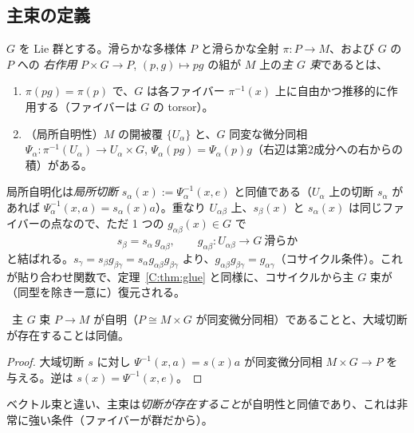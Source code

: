 \subsection{主束の定義}
\begin{defn}[主 $G$ 束]\label{C:def:principal}
$G$ を Lie 群とする。滑らかな多様体 $P$ と滑らかな全射 $\pi:P\to M$、および $G$ の $P$ への \emph{右作用} $P\times G\to P$, $(p,g)\mapsto pg$ の組が $M$ 上の\emph{主 $G$ 束}であるとは、
\begin{enumerate}
\item $\pi(pg)=\pi(p)$ で、$G$ は各ファイバー $\pi^{-1}(x)$ 上に自由かつ推移的に作用する（ファイバーは $G$ の torsor）。
\item （局所自明性）$M$ の開被覆 $\{U_\alpha\}$ と、$G$ 同変な微分同相 $\Psi_\alpha:\pi^{-1}(U_\alpha)\to U_\alpha\times G$, $\Psi_\alpha(pg)=\Psi_\alpha(p)g$（右辺は第2成分への右からの積）がある。
\end{enumerate}
\end{defn}
局所自明化は\emph{局所切断} $s_\alpha(x):=\Psi_\alpha^{-1}(x,e)$ と同値である（$U_\alpha$ 上の切断 $s_\alpha$ があれば $\Psi_\alpha^{-1}(x,a)=s_\alpha(x)a$）。重なり $U_{\alpha\beta}$ 上、$s_\beta(x)$ と $s_\alpha(x)$ は同じファイバーの点なので、ただ 1 つの $g_{\alpha\beta}(x)\in G$ で
\begin{equation}\label{C:eq:Ptrans}
s_\beta=s_\alpha\,g_{\alpha\beta},\qquad g_{\alpha\beta}:U_{\alpha\beta}\to G\ \text{滑らか}
\end{equation}
と結ばれる。$s_\gamma=s_\beta g_{\beta\gamma}=s_\alpha g_{\alpha\beta}g_{\beta\gamma}$ より、$g_{\alpha\beta}g_{\beta\gamma}=g_{\alpha\gamma}$（コサイクル条件）。これが貼り合わせ関数で、定理~\ref{C:thm:glue} と同様に、コサイクルから主 $G$ 束が（同型を除き一意に）復元される。

\begin{prop}\label{C:prop:Ptriv}\tP\
主 $G$ 束 $P\to M$ が自明（$P\cong M\times G$ が同変微分同相）であることと、大域切断が存在することは同値。
\end{prop}
\begin{proof}
大域切断 $s$ に対し $\Psi^{-1}(x,a)=s(x)a$ が同変微分同相 $M\times G\to P$ を与える。逆は $s(x)=\Psi^{-1}(x,e)$。
\end{proof}
ベクトル束と違い、主束は\emph{切断が存在すること}が自明性と同値であり、これは非常に強い条件（ファイバーが群だから）。

